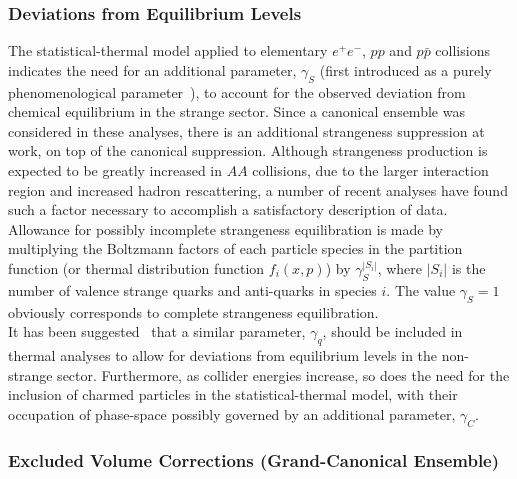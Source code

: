 \documentclass{elsarticle}
\begin{document}
\subsubsection{Deviations from Equilibrium Levels}\label{SubSection::Gammas}

The statistical-thermal model applied to elementary $e^+e^-$, $pp$ and
$p\bar{p}$ collisions~\cite{Becattini:1995if,Becattini:1997rv} indicates the need for an
additional parameter, $\gamma_S$ (first introduced as a purely 
phenomenological parameter~\cite{Koch:1986ud,Rafelski:1991rh,Letessier:1993qa,Slotta:1995bh}), to account for the
observed deviation from chemical equilibrium in the strange
sector. Since a canonical ensemble was considered in these analyses,
there is an additional strangeness suppression at work, on top of the
canonical suppression. Although strangeness production is expected to
be greatly increased in $AA$ collisions, due to the larger interaction
region and increased hadron rescattering, a number of recent analyses 
\cite{Becattini:1997ii,Becattini:2003wp,Bearden:2002ib,Cleymans:2001at,Cleymans:2002xu,Cleymans:2003yp} have found such a factor necessary to
accomplish a satisfactory description of data.\\

Allowance for possibly incomplete strangeness equilibration is made by 
multiplying the Boltzmann factors of each particle species in the 
partition function (or thermal distribution function $f_i(x,p)$) 
by $\gamma_S^{\left|S_i\right|}$, where $\left|S_i\right|$ is 
the number of valence strange quarks and anti-quarks in species 
$i$. The value $\gamma_S = 1$ obviously corresponds to
complete strangeness equilibration.\\  

It has been suggested~\cite{Letessier:1998sz} that a similar parameter, 
$\gamma_q$, should be included in thermal analyses to allow for 
deviations from equilibrium levels in the non-strange sector. 
Furthermore, as collider energies increase, so does the need for the inclusion of 
charmed particles in the statistical-thermal model, with their 
occupation of phase-space possibly governed by an additional 
parameter, $\gamma_C$.\\  

\subsubsection{Excluded Volume Corrections (Grand-Canonical Ensemble)}\label{Excl Vol Corrections}
\end{document}
